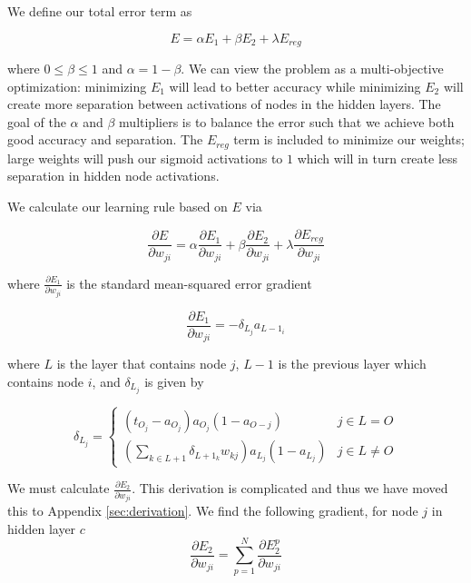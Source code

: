We define our total error term as

\begin{equation}
  E = \alpha E_1 + \beta E_2 + \lambda E_{reg}
\end{equation}

where $0 \leq \beta \leq 1$ and $\alpha = 1 - \beta$.
We can view the problem as a multi-objective optimization:
minimizing $E_1$ will lead to better accuracy while
minimizing $E_2$ will create more separation between activations of
nodes in the hidden layers. The goal of the $\alpha$ and $\beta$
multipliers is to balance the error such that we achieve
both good accuracy and separation. The $E_{reg}$ term is included
to minimize our weights; large weights will push our sigmoid
activations to $1$ which will in turn create less separation in
hidden node activations.

We calculate our learning rule based on $E$ via

\begin{equation}
  \frac{\partial E}{\partial w_{ji}} = \alpha \frac{\partial E_1}{\partial w_{ji}} + \beta \frac{\partial E_2}{\partial w_{ji}} + \lambda \frac{\partial E_{reg}}{\partial w_{ji}}
\end{equation}

where $\frac{\partial E_1}{\partial w_{ji}}$ is the standard mean-squared error gradient

\begin{equation}
  \frac{\partial E_1}{\partial w_{ji}} = -\delta_{L_j}a_{L-1_i} 
\end{equation}

where $L$ is the layer that contains node $j$, $L-1$ is the previous layer
which contains node $i$, and $\delta_{L_j}$ is given by

\begin{equation}
  \delta_{L_j} =
  \begin{cases}
    (t_{O_j} - a_{O_j})a_{O_j}(1-a_{O-j}) & j \in L = O \\
    (\sum_{k \in L+1}{\delta_{L+1_k}w_{kj}})a_{L_j}(1-a_{L_j}) & j \in L \neq O
  \end{cases}
\end{equation}

We must calculate $\frac{\partial E_2}{\partial w_{ji}}$. This derivation is
complicated and thus we have moved this to Appendix
\ref{sec:derivation}.
We find the following gradient, for node $j$ in hidden layer $c$
\begin{equation}
    \frac{\partial E_2}{\partial w_{ji}} = \sum_{p=1}^N \frac{\partial E_2^p}{\partial w_{ji}}
\end{equation}

